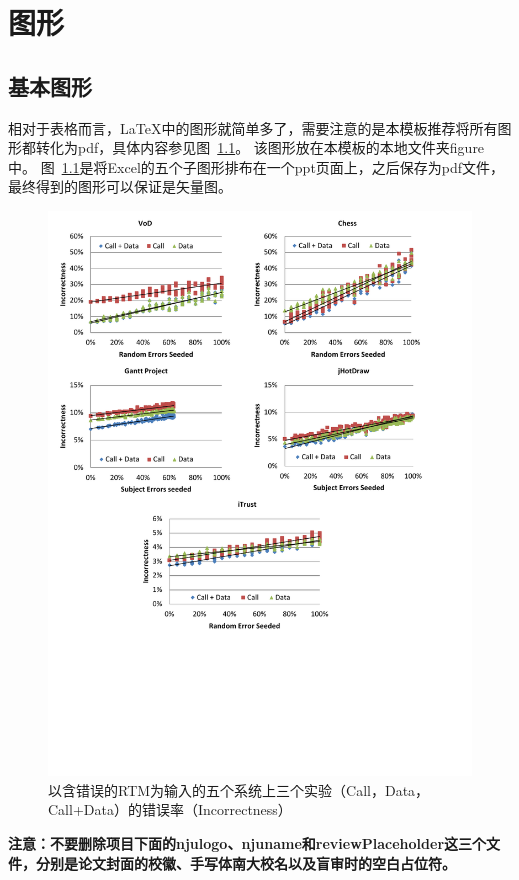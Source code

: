 \chapter{图形}

\section{基本图形}
相对于表格而言，LaTeX中的图形就简单多了，需要注意的是本模板推荐将所有图形都转化为pdf，具体内容参见图~\ref{fig:errorExpCH4}。
该图形放在本模板的本地文件夹figure中。
图~\ref{fig:errorExpCH4}是将Excel的五个子图形排布在一个ppt页面上，之后保存为pdf文件，最终得到的图形可以保证是矢量图。


\begin{figure}[htb]
  \centering
  \includegraphics[width=5in]{figure/chapter4/errorExpCH4.pdf}
  \caption{以含错误的RTM为输入的五个系统上三个实验（Call，Data，Call+Data）的错误率（Incorrectness）}
  \label{fig:errorExpCH4}
\end{figure}

\textbf{注意：不要删除项目下面的njulogo、njuname和reviewPlaceholder这三个文件，分别是论文封面的校徽、手写体南大校名以及盲审时的空白占位符。}

